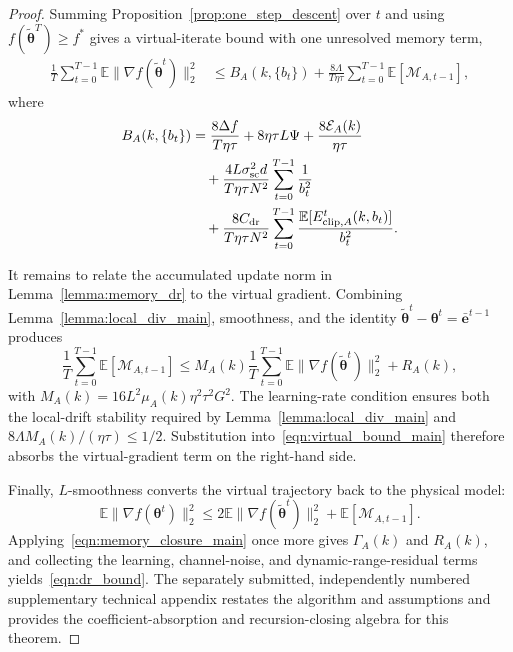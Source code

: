 \documentclass[journal]{IEEEtran}
\newenvironment{revisionblock}{\begingroup\color{revisionred}}{\endgroup}
\begin{document}
\begin{revisionblock}
\begin{proof}
Summing Proposition~\ref{prop:one_step_descent} over $t$ and using $f(\tilde{\boldsymbol{\theta}}^T)\ge f^\ast$ gives a virtual-iterate bound with one unresolved memory term,
{
\begin{align}
	\frac1T\sum_{t=0}^{T-1}
	\mathbb{E}\|\nabla f(\tilde{\boldsymbol{\theta}}^t)\|_2^2
	&\le B_A(k,\{b_t\})
		+\frac{8\Lambda}{T\eta\tau}
	\sum_{t=0}^{T-1}\mathbb{E}[\mathcal{M}_{A,t-1}],
	\label{eqn:virtual_bound_main}
\end{align}
}
where
{
\begin{align}
	B_A(k,\{b_t\})
	&=\frac{8\Delta f}{T\eta\tau}
		+8\eta\tau L\Psi
	+\frac{8\mathcal{E}_A(k)}{\eta\tau}
	\notag\\
	&\quad+\frac{4L\sigma_{\mathrm{sc}}^2d}{T\eta\tau N^2}
	\sum_{t=0}^{T-1}\frac1{b_t^2}
	\notag\\
	&\quad+\frac{8C_{\mathrm{dr}}}{T\eta\tau N^2}
	\sum_{t=0}^{T-1}
	\frac{\mathbb{E}[E_{\mathrm{clip},A}^t(k,b_t)]}{b_t^2}.
	\label{eqn:BA_main}
\end{align}
}

It remains to relate the accumulated update norm in Lemma~\ref{lemma:memory_dr} to the virtual gradient. Combining Lemma~\ref{lemma:local_div_main}, smoothness, and the identity $\tilde{\boldsymbol{\theta}}^t-\boldsymbol{\theta}^t=\bar{\mathbf{e}}^{t-1}$ produces
{
\begin{equation}
	\frac1T\sum_{t=0}^{T-1}\mathbb{E}[\mathcal{M}_{A,t-1}]
	\le M_A(k)\frac1T\sum_{t=0}^{T-1}
	\mathbb{E}\|\nabla f(\tilde{\boldsymbol{\theta}}^t)\|_2^2
	+R_A(k),
	\label{eqn:memory_closure_main}
\end{equation}
}
with $M_A(k)=16L^2\mu_A(k)\eta^2\tau^2G^2$. The learning-rate condition ensures both the local-drift stability required by Lemma~\ref{lemma:local_div_main} and $8\Lambda M_A(k)/(\eta\tau)\le1/2$. Substitution into~\eqref{eqn:virtual_bound_main} therefore absorbs the virtual-gradient term on the right-hand side.

Finally, $L$-smoothness converts the virtual trajectory back to the physical model:
{
\begin{equation}
	\mathbb{E}\|\nabla f(\boldsymbol{\theta}^t)\|_2^2
	\le2\mathbb{E}\|\nabla f(\tilde{\boldsymbol{\theta}}^t)\|_2^2
	+\mathbb{E}[\mathcal{M}_{A,t-1}].
\end{equation}
}
Applying~\eqref{eqn:memory_closure_main} once more gives $\Gamma_A(k)$ and $R_A(k)$, and collecting the learning, channel-noise, and dynamic-range-residual terms yields~\eqref{eqn:dr_bound}. The separately submitted, independently numbered supplementary technical appendix restates the algorithm and assumptions and provides the coefficient-absorption and recursion-closing algebra for this theorem.
\end{proof}


\end{revisionblock}
\end{document}
